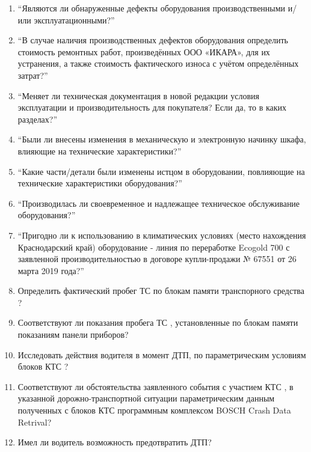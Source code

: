 \begin{enumerate}
	\item \enquote{Являются ли обнаруженные дефекты оборудования производственными и/или эксплуатационными?}
	
	\item \enquote{В случае наличия производственных дефектов оборудования определить стоимость ремонтных работ, произведённых ООО «ИКАРА», для их устранения, а также стоимость фактического износа с учётом определённых затрат?}
	
	\item \enquote{Меняет ли техническая документация в новой редакции условия эксплуатации и производительность для покупателя? Если да, то в каких разделах?}
	
	\item \enquote{Были ли внесены изменения в механическую и электронную начинку шкафа, влияющие на технические характеристики?}
	
	\item \enquote{Какие части/детали были изменены истцом в оборудовании, повлияющие на технические характеристики оборудования?}
	
	\item \enquote{Производилась ли своевременное и надлежащее техническое обслуживание оборудования?}
	
	\item \enquote{Пригодно ли к использованию в климатических условиях (место нахождения 	Краснодарский край) оборудование - линия по переработке Ecogold 700 с заявленной производительностью в договоре купли-продажи № 67551 от 26 		марта 2019 года?}
	
	\item Определить фактический пробег ТС по блокам памяти транспорного средства  ?
	
	\item Соответствуют ли показания пробега ТС  , установленные по блокам памяти показаниям панели приборов?
	
	\item Исследовать действия водителя в момент ДТП, по параметрическим
	условиям блоков КТС ?
	
	\item Соответствуют ли обстоятельства заявленного события с участием КТС
 , в указанной дорожно-транспортной 	ситуации параметрическим данным полученных с блоков КТС 	программным комплексом BOSCH Crash Data Retrival?

     \item Имел ли водитель возможность предотвратить ДТП?
	

\end{enumerate}
